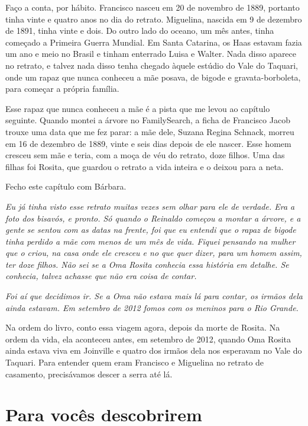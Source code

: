 \documentclass[
  brazilian,
  11pt,
  openany]{book}
\begin{document}
Faço a conta, por hábito. Francisco nasceu em 20 de novembro de 1889,
portanto tinha vinte e quatro anos no dia do retrato. Miguelina, nascida
em 9 de dezembro de 1891, tinha vinte e dois. Do outro lado do oceano,
um mês antes, tinha começado a Primeira Guerra Mundial. Em Santa
Catarina, os Haas estavam fazia um ano e meio no Brasil e tinham
enterrado Luisa e Walter. Nada disso aparece no retrato, e talvez nada
disso tenha chegado àquele estúdio do Vale do Taquari, onde um rapaz que
nunca conheceu a mãe posava, de bigode e gravata-borboleta, para começar
a própria família.

Esse rapaz que nunca conheceu a mãe é a pista que me levou ao capítulo
seguinte. Quando montei a árvore no FamilySearch, a ficha de Francisco
Jacob trouxe uma data que me fez parar: a mãe dele, Suzana Regina
Schnack, morreu em 16 de dezembro de 1889, vinte e seis dias depois de
ele nascer. Esse homem cresceu sem mãe e teria, com a moça de véu do
retrato, doze filhos. Uma das filhas foi Rosita, que guardou o retrato a
vida inteira e o deixou para a neta.

Fecho este capítulo com Bárbara.

\emph{Eu já tinha visto esse retrato muitas vezes sem olhar para ele de
verdade. Era a foto dos bisavós, e pronto. Só quando o Reinaldo começou
a montar a árvore, e a gente se sentou com as datas na frente, foi que
eu entendi que o rapaz de bigode tinha perdido a mãe com menos de um mês
de vida. Fiquei pensando na mulher que o criou, na casa onde ele cresceu
e no que quer dizer, para um homem assim, ter doze filhos. Não sei se a
Oma Rosita conhecia essa história em detalhe. Se conhecia, talvez
achasse que não era coisa de contar.}

\emph{Foi aí que decidimos ir. Se a Oma não estava mais lá para contar,
os irmãos dela ainda estavam. Em setembro de 2012 fomos com os meninos
para o Rio Grande.}

Na ordem do livro, conto essa viagem agora, depois da morte de Rosita.
Na ordem da vida, ela aconteceu antes, em setembro de 2012, quando Oma
Rosita ainda estava viva em Joinville e quatro dos irmãos dela nos
esperavam no Vale do Taquari. Para entender quem eram Francisco e
Miguelina no retrato de casamento, precisávamos descer a serra até lá.

\section{Para vocês descobrirem}\label{para-vocuxeas-descobrirem-10}
\end{document}
